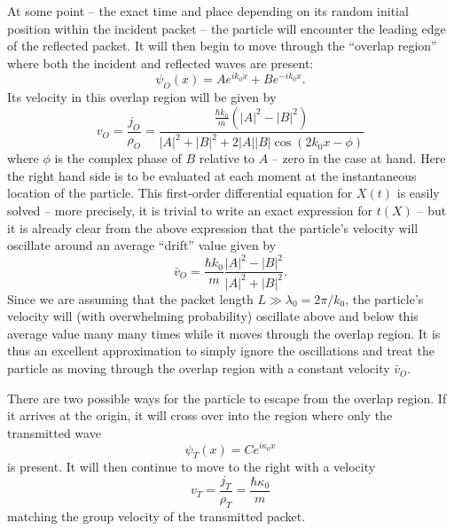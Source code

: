 \documentclass[aps,prc,twocolumn,letterpaper,floatfix]{revtex4}
\begin{document}
At some point -- the exact time and place depending on its random
initial position within the incident packet -- the particle will
encounter the leading edge of the reflected packet.  It will then
begin to move through the ``overlap region'' where both the incident
and reflected waves are present:
\begin{equation}
\psi_O(x) = A e^{ik_0x} + B e^{-ik_0x}.
\end{equation}
Its velocity in this overlap region will be given by
\begin{equation}
v_O = \frac{j_O}{\rho_O} = \frac{ \frac{\hbar k_0}{m} \left(
    |A|^2 - |B|^2 \right)}{|A|^2 + |B|^2 + 2 |A|  |B| \cos(2 k_0 x-\phi)}
\label{vO}
\end{equation}
where $\phi$ is the complex phase of $B$ relative to $A$ -- zero in
the case at hand.
Here the right hand side is to be evaluated at each moment at the
instantaneous location of the particle.  This first-order differential
equation for $X(t)$ is easily solved -- more precisely, it is trivial to
write an exact expression for $t(X)$ -- but it is already clear from
the above expression that the particle's velocity will oscillate
around an average ``drift'' value given by
\begin{equation}
\bar{v}_O = \frac{\hbar k_0}{m} \frac{ |A|^2 - |B|^2}{|A|^2 + |B|^2}.
\label{voverlap}
\end{equation}
Since we are assuming that the packet length $L \gg \lambda_0 = 2 \pi
/ k_0$, the particle's velocity will (with overwhelming probability)
oscillate above and below this average value many many times while it
moves through the overlap region.  It is
thus an excellent approximation to simply ignore the oscillations and
treat the particle as moving through the overlap region with a
constant velocity $\bar{v}_O$.  






There are two possible ways for the particle to escape from the
overlap region.  If it arrives at the origin, it will cross
over into the region where only the transmitted wave
\begin{equation}
\psi_T(x) = C e^{i \kappa_0 x}
\end{equation}
is present.  It will then continue to move to the right with a
velocity
\begin{equation}
v_T =\frac{j_T}{\rho_T}= \frac{\hbar \kappa_0}{m}
\end{equation}
matching the group velocity of the transmitted packet.  
\end{document}
